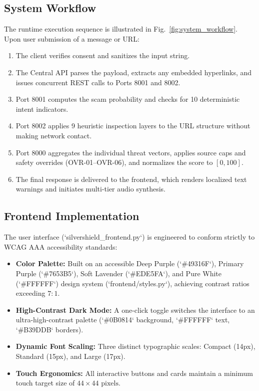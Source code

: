 \documentclass[conference]{IEEEtran}
\begin{document}
\subsection{System Workflow}
The runtime execution sequence is illustrated in Fig.~\ref{fig:system_workflow}. Upon user submission of a message or URL:
\begin{enumerate}
    \item The client verifies consent and sanitizes the input string.
    \item The Central API parses the payload, extracts any embedded hyperlinks, and issues concurrent REST calls to Ports 8001 and 8002.
    \item Port 8001 computes the scam probability and checks for 10 deterministic intent indicators.
    \item Port 8002 applies 9 heuristic inspection layers to the URL structure without making network contact.
    \item Port 8000 aggregates the individual threat vectors, applies source caps and safety overrides (OVR-01--OVR-06), and normalizes the score to $[0, 100]$.
    \item The final response is delivered to the frontend, which renders localized text warnings and initiates multi-tier audio synthesis.
\end{enumerate}

\subsection{Frontend Implementation}
The user interface (`silvershield_frontend.py`) is engineered to conform strictly to WCAG AAA accessibility standards:
\begin{itemize}
    \item \textbf{Color Palette:} Built on an accessible Deep Purple (`\#49316F`), Primary Purple (`\#7653B5`), Soft Lavender (`\#EDE5FA`), and Pure White (`\#FFFFFF`) design system (`frontend/styles.py`), achieving contrast ratios exceeding $7:1$.
    \item \textbf{High-Contrast Dark Mode:} A one-click toggle switches the interface to an ultra-high-contrast palette (`\#0B0814` background, `\#FFFFFF` text, `\#B39DDB` borders).
    \item \textbf{Dynamic Font Scaling:} Three distinct typographic scales: Compact (14px), Standard (15px), and Large (17px).
    \item \textbf{Touch Ergonomics:} All interactive buttons and cards maintain a minimum touch target size of $44 \times 44\text{ pixels}$.
\end{itemize}
\end{document}
